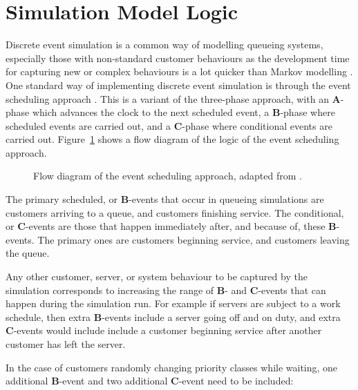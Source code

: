 \documentclass{article}
\begin{document}
\section{Simulation Model Logic}\label{sec:simulation}
Discrete event simulation is a common way of modelling queueing systems,
especially those with non-standard customer behaviours as the development time
for capturing new or complex behaviours is a lot quicker than Markov modelling
\cite{standfield14}.
One standard way of implementing discrete event simulation is through the event
scheduling approach \cite{robinson14}. This is a variant of the three-phase
approach, with an \textbf{A}-phase which advances the clock to the next
scheduled event, a \textbf{B}-phase where scheduled events are carried out, and
a \textbf{C}-phase where conditional events are carried out.
Figure~\ref{fig:eventscheduling} shows a flow diagram of the logic of the event
scheduling approach.

\begin{figure}
    \centering
    
    \caption{Flow diagram of the event scheduling approach, adapted from
    \cite{palmer18}.}
    \label{fig:eventscheduling}
\end{figure}

The primary scheduled, or \textbf{B}-events that occur in queueing simulations
are customers arriving to a queue, and customers finishing service.
The conditional, or \textbf{C}-events are those that happen immediately after,
and because of, these \textbf{B}-events. The primary ones are customers
beginning service, and customers leaving the queue.

Any other customer, server, or system behaviour to be captured by the simulation
corresponds to increasing the range of \textbf{B}- and \textbf{C}-events that
can happen during the simulation run. For example if servers are subject to a
work schedule, then extra \textbf{B}-events include a server going off and on
duty, and extra \textbf{C}-events would include include a customer beginning
service after another customer has left the server.

In the case of customers randomly changing priority classes while waiting, one
additional \textbf{B}-event and two additional \textbf{C}-event need to be
included:
\end{document}

